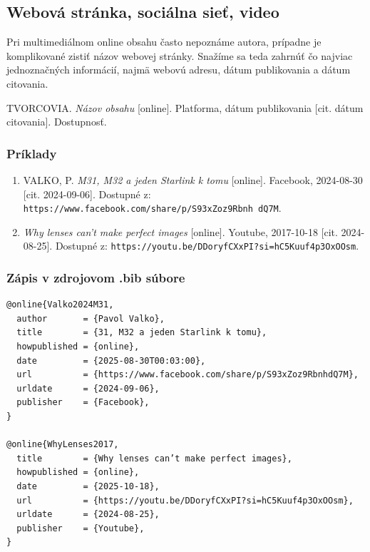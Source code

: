 \documentclass[../../../thesis.tex]{subfiles}
\begin{document}
\subsection{Webová stránka, sociálna sieť, video}
Pri multimediálnom online obsahu často nepoznáme autora,
prípadne je komplikované zistiť názov webovej stránky.
Snažíme sa teda zahrnúť čo najviac jednoznačných informácií,
najmä webovú adresu, dátum publikovania a dátum citovania.
\begin{trivlist}
  \item TVORCOVIA. \textit{Názov obsahu} [online]. Platforma, dátum publikovania [cit. dátum citovania]. Dostupnosť.
\end{trivlist}

\subsubsection*{\normalsize Príklady}
\begin{enumerate}
  \item VALKO, P. \textit{M31, M32 a jeden Starlink k tomu} [online]. Facebook, 2024-08-30 [cit. 2024-09-06]. Dostupné z: \texttt{https://www.facebook.com/share/p/S93xZoz9Rbnh
  dQ7M}.

  \item \textit{Why lenses can't make perfect images} [online]. Youtube, 2017-10-18 [cit. 2024-08-25]. Dostupné z: \texttt{https://youtu.be/DDoryfCXxPI?si=hC5Kuuf4p3OxOOsm}.
\end{enumerate}

\subsubsection*{\normalsize Zápis v zdrojovom .bib súbore}
\begin{verbatim}
@online{Valko2024M31,
  author       = {Pavol Valko},
  title        = {31, M32 a jeden Starlink k tomu},
  howpublished = {online},
  date         = {2025-08-30T00:03:00},
  url          = {https://www.facebook.com/share/p/S93xZoz9RbnhdQ7M},
  urldate      = {2024-09-06},
  publisher    = {Facebook},
}

@online{WhyLenses2017,
  title        = {Why lenses can’t make perfect images},
  howpublished = {online},
  date         = {2025-10-18},
  url          = {https://youtu.be/DDoryfCXxPI?si=hC5Kuuf4p3OxOOsm},
  urldate      = {2024-08-25},
  publisher    = {Youtube},
}
\end{verbatim}
\end{document}
